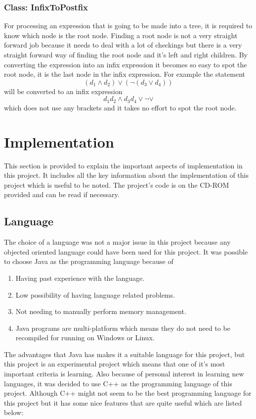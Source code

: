 \documentclass[10pt, a4paper, titlepage]{article}
\begin{document}
\subsubsection{Class: InfixToPostfix}
For processing an expression that is going to be made into a tree, it is required to know which node is the root node. Finding a root node is not a very straight forward job because it needs to deal with a lot of checkings but there is a very straight forward way of finding the root node and it's left and right children. By converting the expression into an infix expression it becomes so easy to spot the root node, it is the last node in the infix expression. For example the statement 
$$ (d_{1} \wedge d_{2}) \vee ( \neg (d_{3} \vee d_{4}))  $$
will be converted to an infix expression 
$$ d_{1} d_{2} \wedge d_{3} d_{4} \vee \neg \vee $$
which does not use any brackets and it takes no effort to spot the root node.
\newpage
\section{Implementation}
\label{sec:Implementation}
This section is provided to explain the important aspects of implementation in this project. It includes all the key information about the implementation of this project which is useful to be noted. The project's code is on the CD-ROM provided and can be read if necessary.
 
\subsection{Language}
The choice of a language was not a major issue in this project because any objected oriented language could have been used for this project. It was possible to choose Java as the programming language because of 

\begin{enumerate}
\item Having past experience with the language.
\item Low possibility of having language related problems.
\item Not needing to manually perform memory management.
\item Java programs are multi-platform which means they do not need to be recompiled for running on Windows or Linux.
\end{enumerate}

The advantages that Java has makes it a suitable language for this project, but this project is an experimental project which means that one of it's most important criteria is learning. Also because of personal interest in learning new languages, it was decided to use C++ as the programming language of this project. Although C++ might not seem to be the best programming language for this project but it has some nice features that are quite useful which are listed below:
\end{document}

